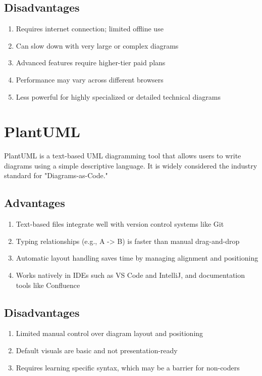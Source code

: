 \subsection{Disadvantages}
\begin{enumerate}
    \item Requires internet connection; limited offline use
    \item Can slow down with very large or complex diagrams
    \item Advanced features require higher-tier paid plans
    \item Performance may vary across different browsers
    \item Less powerful for highly specialized or detailed technical diagrams
\end{enumerate}

\section{PlantUML}

PlantUML is a text-based UML diagramming tool that allows users to write diagrams using a simple descriptive language. It is widely considered the industry standard for "Diagrams-as-Code."

\subsection{Advantages}
\begin{enumerate}
    \item Text-based files integrate well with version control systems like Git
    \item Typing relationships (e.g., A -> B) is faster than manual drag-and-drop
    \item Automatic layout handling saves time by managing alignment and positioning
    \item Works natively in IDEs such as VS Code and IntelliJ, and documentation tools like Confluence
\end{enumerate}

\subsection{Disadvantages}
\begin{enumerate}
    \item Limited manual control over diagram layout and positioning
    \item Default visuals are basic and not presentation-ready
    \item Requires learning specific syntax, which may be a barrier for non-coders
\end{enumerate}

